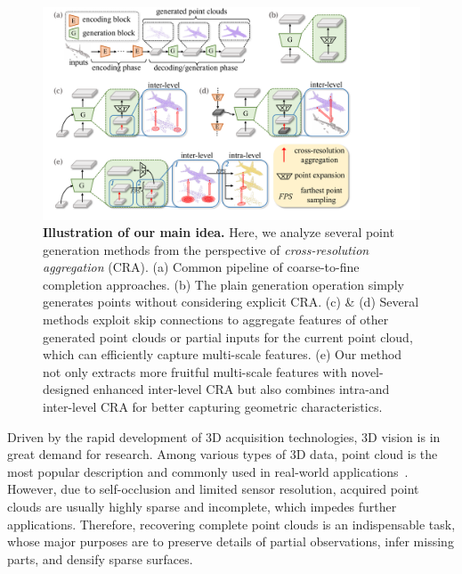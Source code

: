 \documentclass[letterpaper]{article} %
\begin{document}
\begin{figure}[t]
\centering 
\includegraphics[width=1.0\linewidth]{Figures/intro.pdf}
\caption{
{\bf Illustration of our main idea.}
Here, we analyze several point generation methods from the perspective of {\em cross-resolution aggregation} (CRA). 
(a) Common pipeline of coarse-to-fine completion approaches. 
(b) The plain generation operation simply generates points without considering explicit CRA.  
(c) \& (d) Several methods exploit skip connections to aggregate features of other generated point clouds or partial inputs for the current point cloud, which can efficiently  capture multi-scale features. 
(e) Our method not only extracts more fruitful multi-scale features with novel-designed enhanced inter-level CRA but also combines intra-and inter-level CRA for better capturing geometric characteristics.}
\label{fig:intro}
\end{figure}

Driven by the  rapid development of 3D  acquisition technologies, 3D vision is in great demand for research. 
Among various types of 3D data, point cloud is the most  popular description and commonly used in real-world applications~\cite{cadena2016past, reddy2018carfusion, rusu2008towards}. 
However, due to self-occlusion and limited sensor resolution, acquired point clouds are usually highly sparse and incomplete, which impedes further applications. 
Therefore, recovering complete point clouds is an indispensable task, whose major purposes are to preserve details of partial observations, infer missing parts, and densify sparse surfaces.
\end{document}
